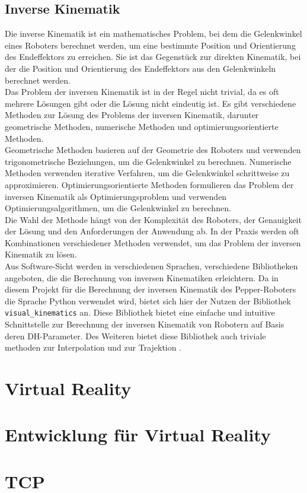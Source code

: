 \subsection{Inverse Kinematik}\label{subsec:InverseKinematik}
Die inverse Kinematik ist ein mathematisches Problem, bei dem die Gelenkwinkel eines Roboters berechnet werden, um eine bestimmte Position und Orientierung des Endeffektors zu erreichen. Sie ist das Gegenstück zur direkten Kinematik, bei der die Position und Orientierung des Endeffektors aus den Gelenkwinkeln berechnet werden.\\
Das Problem der inversen Kinematik ist in der Regel nicht trivial, da es oft mehrere Lösungen gibt oder die Lösung nicht eindeutig ist. Es gibt verschiedene Methoden zur Lösung des Problems der inversen Kinematik, darunter geometrische Methoden, numerische Methoden und optimierungsorientierte Methoden.\\
Geometrische Methoden basieren auf der Geometrie des Roboters und verwenden trigonometrische Beziehungen, um die Gelenkwinkel zu berechnen. Numerische Methoden verwenden iterative Verfahren, um die Gelenkwinkel schrittweise zu approximieren. Optimierungsorientierte Methoden formulieren das Problem der inversen Kinematik als Optimierungsproblem und verwenden Optimierungsalgorithmen, um die Gelenkwinkel zu berechnen.\\
Die Wahl der Methode hängt von der Komplexität des Roboters, der Genauigkeit der Lösung und den Anforderungen der Anwendung ab. In der Praxis werden oft Kombinationen verschiedener Methoden verwendet, um das Problem der inversen Kinematik zu lösen.\\
Aus Software-Sicht werden in verschiedenen Sprachen, verschiedene Bibliotheken angeboten, die die Berechnung von inversen Kinematiken erleichtern. Da in diesem Projekt für die Berechnung der inversen Kinematik des Pepper-Roboters die Sprache Python verwendet wird, bietet sich hier der Nutzen der Bibliothek \texttt{visual\_kinematics} an. Diese Bibliothek bietet eine einfache und intuitive Schnittstelle zur Berechnung der inversen Kinematik von Robotern auf Basis deren DH-Parameter. Des Weiteren bietet diese Bibliothek auch triviale methoden zur Interpolation und zur Trajektion \cite{visual_kinematics}.\\

\section{Virtual Reality}

\section{Entwicklung für Virtual Reality}
\section{TCP}